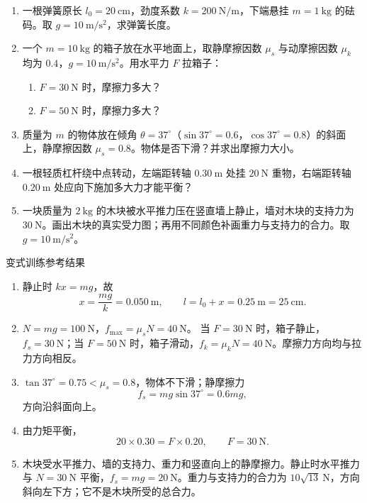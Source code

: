 \begin{enumerate}
  \item 一根弹簧原长 $l_0 = 20\ \mathrm{cm}$，劲度系数 $k = 200\ \mathrm{N/m}$，下端悬挂 $m = 1\ \mathrm{kg}$ 的砝码。取 $g=10\ \mathrm{m/s^2}$，求弹簧长度。

  \item 一个 $m = 10\ \mathrm{kg}$ 的箱子放在水平地面上，取静摩擦因数 $\mu_s$ 与动摩擦因数 $\mu_k$ 均为 $0.4$，$g = 10\ \mathrm{m/s^2}$。用水平力 $F$ 拉箱子：
  \begin{enumerate}
    \item $F = 30\ \mathrm{N}$ 时，摩擦力多大？
    \item $F = 50\ \mathrm{N}$ 时，摩擦力多大？
  \end{enumerate}

  \item 质量为 $m$ 的物体放在倾角 $\theta = 37^\circ$（$\sin37^\circ = 0.6$，$\cos37^\circ = 0.8$）的斜面上，静摩擦因数 $\mu_s = 0.8$。物体是否下滑？并求出摩擦力大小。
  \begin{center}
  
  \end{center}

  \item 一根轻质杠杆绕中点转动，左端距转轴 $0.30\ \mathrm{m}$ 处挂 $20\ \mathrm{N}$ 重物，右端距转轴 $0.20\ \mathrm{m}$ 处应向下施加多大力才能平衡？

  \item 一块质量为 $2\ \mathrm{kg}$ 的木块被水平推力压在竖直墙上静止，墙对木块的支持力为 $30\ \mathrm{N}$。画出木块的真实受力图；再用不同颜色补画重力与支持力的合力。取 $g=10\ \mathrm{m/s^2}$。
\end{enumerate}

\begin{learningbox}{变式训练参考结果}
\begin{enumerate}[itemsep=0.45em,topsep=0.3em,parsep=0pt]
  \item 静止时 $kx=mg$，故
  \[
  x=\frac{mg}{k}=0.050\ \mathrm{m},\qquad
  l=l_0+x=0.25\ \mathrm{m}=25\ \mathrm{cm}.
  \]

  \item $N=mg=100\ \mathrm{N}$，$f_{\max}=\mu_sN=40\ \mathrm{N}$。
  当 $F=30\ \mathrm{N}$ 时，箱子静止，$f_s=30\ \mathrm{N}$；当 $F=50\ \mathrm{N}$ 时，箱子滑动，$f_k=\mu_kN=40\ \mathrm{N}$。摩擦力方向均与拉力方向相反。

  \item $\tan37^\circ=0.75<\mu_s=0.8$，物体不下滑；静摩擦力
  \[
  f_s=mg\sin37^\circ=0.6mg,
  \]
  方向沿斜面向上。

  \item 由力矩平衡，
  \[
  20\times0.30=F\times0.20,
  \qquad F=30\ \mathrm{N}.
  \]

  \item 木块受水平推力、墙的支持力、重力和竖直向上的静摩擦力。静止时水平推力与
  $N=30\ \mathrm{N}$ 平衡，$f_s=mg=20\ \mathrm{N}$。重力与支持力的合力为
  $10\sqrt{13}\ \mathrm{N}$，方向斜向左下方；它不是木块所受的总合力。
\end{enumerate}
\end{learningbox}

